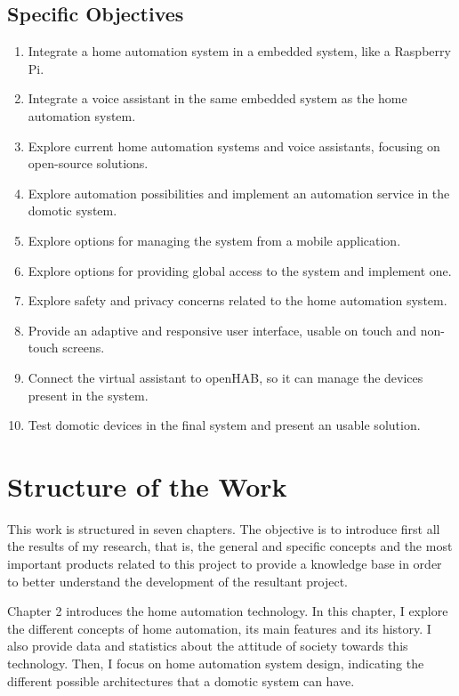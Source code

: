 \subsection{Specific Objectives}
\begin{enumerate}
	\item Integrate a home automation system in a embedded system, like a Raspberry Pi.
	\item Integrate a voice assistant in the same embedded system as the home automation system.
	\item Explore current home automation systems and voice assistants, focusing on open-source solutions.
	\item Explore automation possibilities and implement an automation service in the domotic system.
	\item Explore options for managing the system from a mobile application.
	\item Explore options for providing global access to the system and implement one.
	\item Explore safety and privacy concerns related to the home automation system.
	\item Provide an adaptive and responsive user interface, usable on touch and non-touch screens.
	\item Connect the virtual assistant to openHAB, so it can manage the devices present in the system.
	\item Test domotic devices in the final system and present an usable solution.
\end{enumerate}

\section{Structure of the Work}
This work is structured in seven chapters. The objective is to introduce first all the results of my research, that is, the general
and specific concepts and the most important products related to this project to provide a knowledge base in order to better 
understand the development of the resultant project.

Chapter 2 introduces the home automation technology. In this chapter, I explore the different concepts of home automation,
its main features and its history. I also provide data and statistics about the attitude of society towards this technology. Then,
I focus on home automation system design, indicating the different possible architectures that a domotic system can have.


